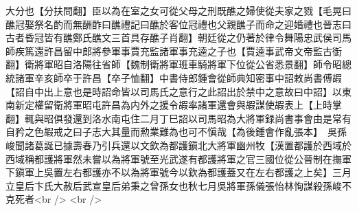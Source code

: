大分也【分扶問翻】臣以為在室之女可從父母之刑既醮之婦使從夫家之戮【毛晃曰醮冠娶祭名酌而無酬酢曰醮禮記曰醮於客位冠禮也父親醮子而命之迎婚禮也晉志曰古者昏冠皆有醮鄭氏醮文三首具存醮子肖翻】朝廷從之仍著於律令舞陽忠武侯司馬師疾篤還許昌留中郎將參軍事賈充監諸軍事充逵之子也【賈逵事武帝文帝監古衘翻】衛將軍昭自洛陽往省師【魏制衛將軍班車騎將軍下位從公省悉景翻】師令昭總統諸軍辛亥師卒于許昌【卒子恤翻】中書侍郎鍾會從師典知密事中詔敕尚書傅嘏【詔自中出上意也是時詔命皆以司馬氏之意行之此詔出於禁中之意故曰中詔】以東南新定權留衛將軍昭屯許昌為内外之援令嘏率諸軍還會與嘏謀使嘏表上【上時掌翻】輒與昭俱發還到洛水南屯住二月丁巳詔以司馬昭為大將軍録尚書事會由是常有自矜之色嘏戒之曰子志大其量而勲業難為也可不愼哉【為後鍾會作亂張本】　吳孫峻聞諸葛誕已據壽春乃引兵還以文欽為都護鎭北大將軍幽州牧【漢置都護於西域於西域稱都護將軍然未嘗以為將軍號至光武遂有都護將軍之官三國位從公晉制在撫軍下鎭軍上吳置左右都護亦不以為將軍號今以欽為都護蓋又在左右都護之上矣】三月立皇后卞氏大赦后武宣皇后弟秉之曾孫女也秋七月吳將軍孫儀張怡林恂謀殺孫峻不克死者<br />
<br />

